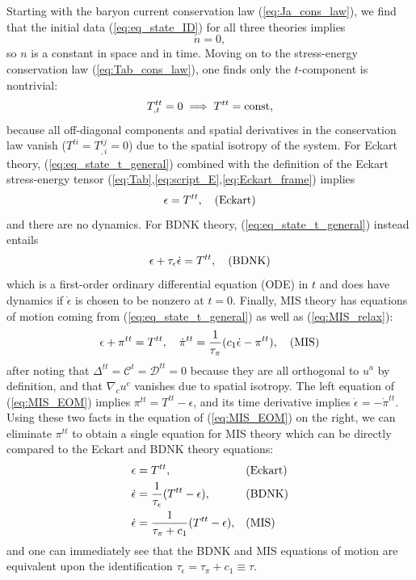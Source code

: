 \documentclass[%
notitlepage,
superscriptaddress,
nofootinbib,
amsmath,
amssymb,
aps,
twocolumn
]{revtex4-1}
\begin{document}
Starting with the baryon current conservation law (\ref{eq:Ja_cons_law}),
we find that the initial data (\ref{eq:eq_state_ID}) for all three theories
implies 
\begin{equation}
\dot{n} = 0,
\end{equation}
so $n$ is a constant in space and in time.  Moving on to the stress-energy conservation law (\ref{eq:Tab_cons_law}), one finds only the $t$-component is nontrivial:
\begin{equation} \label{eq:eq_state_t_general}
T^{tt}_{,t} = 0 \implies T^{tt} = \textnormal{const},
\end{equation}
because all off-diagonal components and spatial derivatives in the conservation law vanish ($T^{ti} = T^{ij}_{,i} = 0$) due to the spatial isotropy of the system.  For Eckart theory, (\ref{eq:eq_state_t_general}) combined with the definition of the Eckart stress-energy tensor (\ref{eq:Tab},\ref{eq:script_E},\ref{eq:Eckart_frame}) implies
\begin{equation}
\epsilon = T^{tt}, ~~~ \textnormal{(Eckart)}
\end{equation}
and there are no dynamics.
For BDNK theory, (\ref{eq:eq_state_t_general}) instead entails
\begin{equation}
\epsilon + \tau_{\epsilon} \dot{\epsilon} = T^{tt}, ~~~ \textnormal{(BDNK)}
\end{equation}
which is a first-order ordinary differential equation (ODE) in $t$ and does have dynamics if $\dot{\epsilon}$ is chosen to be nonzero at $t = 0$.  Finally, MIS theory has equations of motion coming from (\ref{eq:eq_state_t_general}) as well as (\ref{eq:MIS_relax}):
\begin{equation} \label{eq:MIS_EOM}
\epsilon + \pi^{tt} = T^{tt}, ~~~ \dot{\pi}^{tt} = \frac{1}{\tau_{\pi}}(c_1 \dot{\epsilon} - \pi^{tt}), ~~~ \textnormal{(MIS)}
\end{equation}
after noting that 
$\Delta^{tt} = \mathcal{C}^{t} = \mathcal{D}^{tt} = 0$ because they are all orthogonal to $u^{a}$ by definition, and that $\nabla_{c} u^{c}$ vanishes due to spatial isotropy.
The left equation of (\ref{eq:MIS_EOM}) implies $\pi^{tt} = T^{tt} - \epsilon$, and its time derivative implies $\dot{\epsilon} = -\dot{\pi}^{tt}$.  Using these two facts in the equation of (\ref{eq:MIS_EOM}) on the right, we can eliminate $\pi^{tt}$ to obtain a single equation for MIS theory which can be directly compared to the Eckart and BDNK theory equations:
\begin{equation} \label{eq:theory_comp}
\begin{aligned}
\epsilon &= T^{tt}, &&\textnormal{(Eckart)} \\
\dot{\epsilon} &= \frac{1}{\tau_{\epsilon}} (T^{tt} - \epsilon), &&\textnormal{(BDNK)} \\
\dot{\epsilon} &= \frac{1}{\tau_{\pi} + c_1} (T^{tt} - \epsilon), &&\textnormal{(MIS)}
\end{aligned}
\end{equation}
and one can immediately see that the BDNK and MIS equations of motion are equivalent upon the identification $\tau_{\epsilon} = \tau_{\pi} + c_1 \equiv \tau$.
\end{document}
